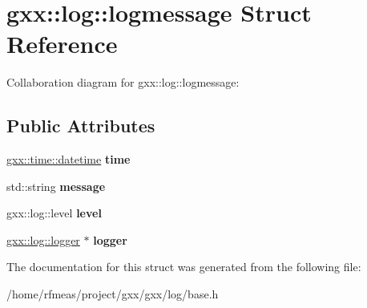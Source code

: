 \hypertarget{structgxx_1_1log_1_1logmessage}{}\section{gxx\+:\+:log\+:\+:logmessage Struct Reference}
\label{structgxx_1_1log_1_1logmessage}


Collaboration diagram for gxx\+:\+:log\+:\+:logmessage\+:
\subsection*{Public Attributes}
\begin{DoxyCompactItemize}
\item 
\hyperlink{structgxx_1_1time_1_1datetime}{gxx\+::time\+::datetime} {\bfseries time}\hypertarget{structgxx_1_1log_1_1logmessage_a3f1a34a0a0d1d8a38c0bf918e4733447}{}\label{structgxx_1_1log_1_1logmessage_a3f1a34a0a0d1d8a38c0bf918e4733447}

\item 
std\+::string {\bfseries message}\hypertarget{structgxx_1_1log_1_1logmessage_a51747e71de4c7f675f04487c9e9b9354}{}\label{structgxx_1_1log_1_1logmessage_a51747e71de4c7f675f04487c9e9b9354}

\item 
gxx\+::log\+::level {\bfseries level}\hypertarget{structgxx_1_1log_1_1logmessage_a061c00da001e91c343a01178f7932af1}{}\label{structgxx_1_1log_1_1logmessage_a061c00da001e91c343a01178f7932af1}

\item 
\hyperlink{classgxx_1_1log_1_1logger}{gxx\+::log\+::logger} $\ast$ {\bfseries logger}\hypertarget{structgxx_1_1log_1_1logmessage_a9f96533b5144250c26fc4a1da42ce5ba}{}\label{structgxx_1_1log_1_1logmessage_a9f96533b5144250c26fc4a1da42ce5ba}

\end{DoxyCompactItemize}


The documentation for this struct was generated from the following file\+:\begin{DoxyCompactItemize}
\item 
/home/rfmeas/project/gxx/gxx/log/base.\+h\end{DoxyCompactItemize}
